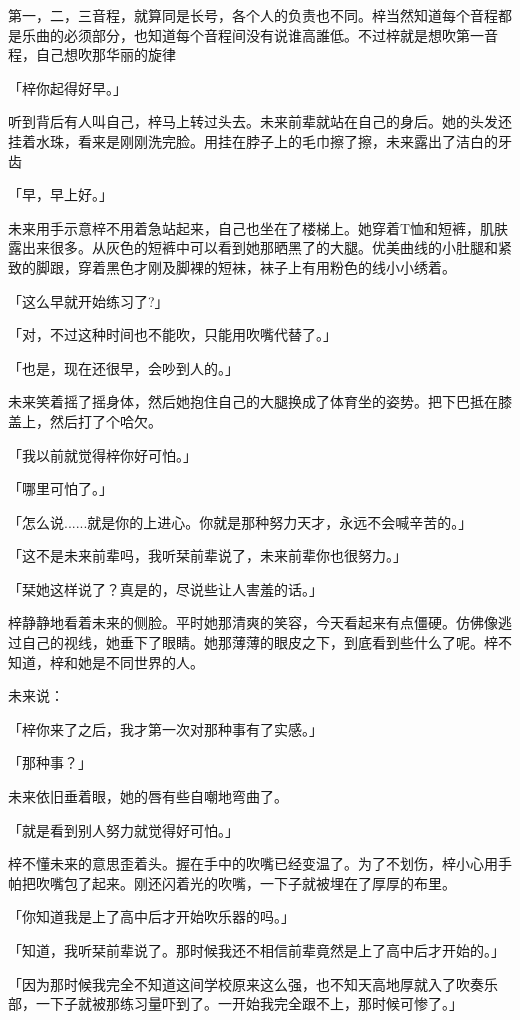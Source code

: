 \documentclass[UTF8]{ctexart}
\begin{document}
    第一，二，三音程，就算同是长号，各个人的负责也不同。梓当然知道每个音程都是乐曲的必须部分，也知道每个音程间没有说谁高誰低。不过梓就是想吹第一音程，自己想吹那华丽的旋律

    「梓你起得好早。」

    听到背后有人叫自己，梓马上转过头去。未来前辈就站在自己的身后。她的头发还挂着水珠，看来是刚刚洗完脸。用挂在脖子上的毛巾擦了擦，未来露出了洁白的牙齿

    「早，早上好。」

    未来用手示意梓不用着急站起来，自己也坐在了楼梯上。她穿着T恤和短裤，肌肤露出来很多。从灰色的短裤中可以看到她那晒黑了的大腿。优美曲线的小肚腿和紧致的脚跟，穿着黑色才刚及脚裸的短袜，袜子上有用粉色的线小小绣着。

    「这么早就开始练习了?」

    「对，不过这种时间也不能吹，只能用吹嘴代替了。」

    「也是，现在还很早，会吵到人的。」

    未来笑着摇了摇身体，然后她抱住自己的大腿换成了体育坐的姿势。把下巴抵在膝盖上，然后打了个哈欠。

    「我以前就觉得梓你好可怕。」

    「哪里可怕了。」

    「怎么说......就是你的上进心。你就是那种努力天才，永远不会喊辛苦的。」

    「这不是未来前辈吗，我听栞前辈说了，未来前辈你也很努力。」

    「栞她这样说了？真是的，尽说些让人害羞的话。」

    梓静静地看着未来的侧脸。平时她那清爽的笑容，今天看起来有点僵硬。仿佛像逃过自己的视线，她垂下了眼睛。她那薄薄的眼皮之下，到底看到些什么了呢。梓不知道，梓和她是不同世界的人。

    未来说：

    「梓你来了之后，我才第一次对那种事有了实感。」

    「那种事？」

    未来依旧垂着眼，她的唇有些自嘲地弯曲了。

    「就是看到别人努力就觉得好可怕。」

    梓不懂未来的意思歪着头。握在手中的吹嘴已经变温了。为了不划伤，梓小心用手帕把吹嘴包了起来。刚还闪着光的吹嘴，一下子就被埋在了厚厚的布里。

    「你知道我是上了高中后才开始吹乐器的吗。」

    「知道，我听栞前辈说了。那时候我还不相信前辈竟然是上了高中后才开始的。」

    「因为那时候我完全不知道这间学校原来这么强，也不知天高地厚就入了吹奏乐部，一下子就被那练习量吓到了。一开始我完全跟不上，那时候可惨了。」
\end{document}
